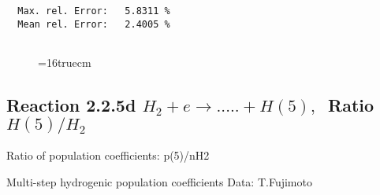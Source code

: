 \documentclass[12pt]{article}
\begin{document}
\begin{small}
\begin{verbatim}
  Max. rel. Error:   5.8311 %
  Mean rel. Error:   2.4005 %


\end{verbatim}\end{small}
\begin{figure} \label{2.2.5c}
\epsfxsize=16truecm
\end{figure}
\newpage
\subsection{
Reaction 2.2.5d  $H_2 + e \rightarrow .....+H(5)   , \  $
Ratio $H(5)/H_2 $
}

 Ratio of population coefficients: p(5)/nH2

 Multi-step hydrogenic population coefficients
 Data: T.Fujimoto
\end{document}
